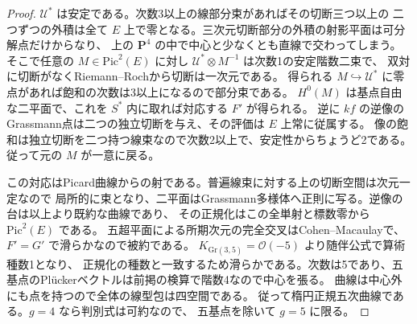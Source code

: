 \begin{proof}
$\mathcal U^*$ は安定である。次数3以上の線部分束があればその切断三つ以上の
二つずつの外積は全て $E$ 上で零となる。三次元切断部分の外積の射影平面は可分解点だけからなり、
上の $\mathbf P^4$ の中で中心と少なくとも直線で交わってしまう。
そこで任意の $M\in\mathrm{Pic}^2(E)$ に対し $\mathcal U^*\otimes M^{-1}$ は次数1の安定階数二束で、
双対に切断がなくRiemann--Rochから切断は一次元である。
得られる $M\hookrightarrow\mathcal U^*$ に零点があれば飽和の次数は3以上になるので部分束である。
$H^0(M)$ は基点自由な二平面で、これを $S^*$ 内に取れば対応する $F'$ が得られる。
逆に $kf$ の逆像のGrassmann点は二つの独立切断を与え、その評価は $E$ 上常に従属する。
像の飽和は独立切断を二つ持つ線束なので次数2以上で、安定性からちょうど2である。
従って元の $M$ が一意に戻る。

この対応はPicard曲線からの射である。普遍線束に対する上の切断空間は次元一定なので
局所的に束となり、二平面はGrassmann多様体へ正則に写る。逆像の台は以上より既約な曲線であり、
その正規化はこの全単射と標数零から $\mathrm{Pic}^2(E)$ である。
五超平面による所期次元の完全交叉はCohen--Macaulayで、$F'=G'$ で滑らかなので被約である。
$K_{\mathrm{Gr}(3,5)}=\mathcal O(-5)$ より随伴公式で算術種数1となり、
正規化の種数と一致するため滑らかである。次数は5であり、五基点のPl\"uckerベクトルは前掲の検算で階数4なので中心を張る。
曲線は中心外にも点を持つので全体の線型包は四空間である。
従って楕円正規五次曲線である。$g=4$ なら判別式は可約なので、
五基点を除いて $g=5$ に限る。
\end{proof}
